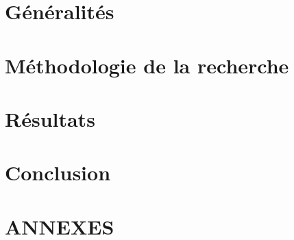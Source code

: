 \documentclass[french]{amu_these}
\begin{document}
	\chapter{ Généralités}
	

	\chapter{ Méthodologie de la recherche}
	

	\chapter{ Résultats}
	

	\chapter*{Conclusion}
	

	\appendix

	\newpage
	\printbibliography[					%
	heading=bibintoc
	]	
	\newpage
	\printindex							%
	\newpage
	\printendnotes						%

	\setcounter{chapter}{0}
	\renewcommand{\thesection}{\Alph{section}}
	
	\chapter*{ANNEXES}
	\newpage
	
	
	\newpage
	
\end{document}

